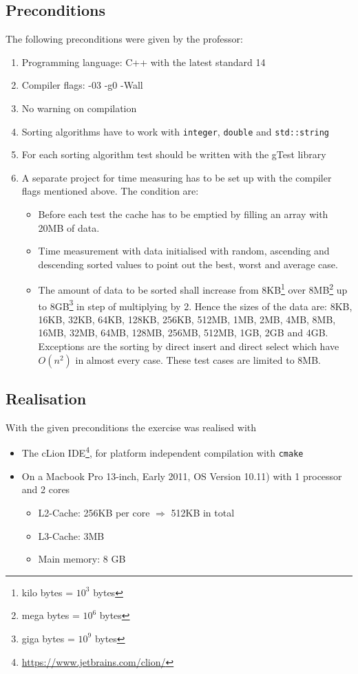 \documentclass[11pt]{amsart}
\begin{document}
\subsection{Preconditions}
The following preconditions were given by the professor:
\begin{enumerate}
	\item Programming language: C++ with the latest standard 14
	\item Compiler flags: -03 -g0 -Wall
	\item No warning on compilation
	\item Sorting algorithms have to work with \texttt{integer}, \texttt{double} and \texttt{std::string}
	\item For each sorting algorithm test should be written with the gTest library
	\item A separate project for time measuring has to be set up with the compiler flags mentioned above. The condition are:
	\begin{itemize}
		\item Before each test the cache has to be emptied by filling an array with 20MB of data.
		\item Time measurement with data initialised with random, ascending and descending sorted values to point out the best, worst and average case.
		\item The amount of data to be sorted shall increase from 8KB\footnote{kilo bytes = $10^3$ bytes} over 8MB\footnote{mega bytes = $10^6$ bytes} up to 8GB\footnote{giga bytes = $10^9$ bytes} in step of multiplying by 2. Hence the sizes of the data are: 8KB, 16KB, 32KB, 64KB, 128KB, 256KB, 512MB, 1MB, 2MB, 4MB, 8MB, 16MB, 32MB, 64MB, 128MB, 256MB, 512MB, 1GB, 2GB and 4GB. Exceptions are the sorting by direct insert and direct select which have $O(n^2)$ in almost every case. These test cases are limited to 8MB.
	\end{itemize}
\end{enumerate}

\subsection{Realisation}
With the given preconditions the exercise was realised with
\begin{itemize}
	\item The cLion IDE\footnote{\url{https://www.jetbrains.com/clion/}}, for platform independent compilation with \texttt{cmake}
	\item On a Macbook Pro 13-inch, Early 2011, OS Version 10.11) with 1 processor and 2 cores
	\begin{itemize}
		\item L2-Cache: 256KB per core $\Rightarrow$ 512KB in total
		\item L3-Cache: 3MB
		\item Main memory: 8 GB
	\end{itemize}
\end{itemize}
\end{document}
